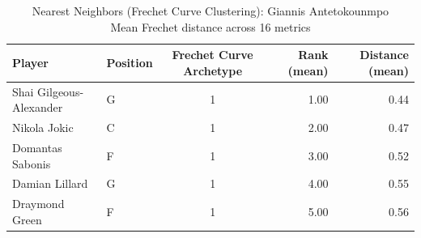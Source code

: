 \begin{table}[t]
\caption*{
{\fontsize{20}{25} Nearest Neighbors (Frechet Curve Clustering): Giannis Antetokounmpo\fontsize{12}{15}\selectfont } \\ 
{\fontsize{14}{17}\selectfont  Mean Frechet distance across 16 metrics\fontsize{12}{15}\selectfont }
} 
\fontsize{12.0pt}{14.0pt}\selectfont
\begin{tabular*}{\linewidth}{@{\extracolsep{\fill}}llcrr}
\toprule
Player & Position & Frechet Curve Archetype & Rank (mean) & Distance (mean) \\ 
\midrule\addlinespace[2.5pt]
Shai Gilgeous-Alexander & G & 1 & 1.00 & 0.44 \\ 
Nikola Jokic & C & 1 & 2.00 & 0.47 \\ 
Domantas Sabonis & F & 1 & 3.00 & 0.52 \\ 
Damian Lillard & G & 1 & 4.00 & 0.55 \\ 
Draymond Green & F & 1 & 5.00 & 0.56 \\ 
\bottomrule
\end{tabular*}
\end{table}

